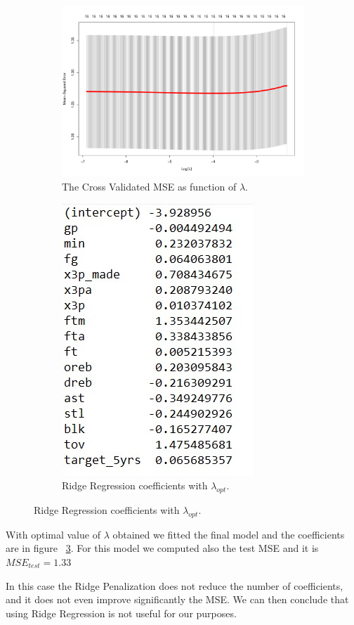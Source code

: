 \begin{figure}[h]
	\centering
	\begin{subfigure}{.6\textwidth}
		\centering
		\includegraphics[width=0.7\linewidth]{ImageFiles/Regression/Ridge/RidgeCvPlot}
		\caption{The Cross Validated MSE as function of $\lambda$.}
		\label{fig:RidgeCvPlot}
	\end{subfigure}%
	\begin{subfigure}{.6\textwidth}
		\centering
		\includegraphics[width=0.4\linewidth]{ImageFiles/Regression/Ridge/FinalRidgeCoef}
		\caption{Ridge Regression coefficients with $\lambda_{opt}$.}
		\label{fig:FinalRidgeCoef}
	\end{subfigure}
\end{figure}

With optimal value of $\lambda$ obtained we fitted the final model and the coefficients are in figure \Fig~\ref{fig:FinalRidgeCoef}. For this model we computed also the test MSE and it is $MSE_{test} = 1.33$

In this case the Ridge Penalization does not reduce the number of coefficients, and it does not even improve significantly the MSE. We can then conclude that using Ridge Regression is not useful for our purposes.

